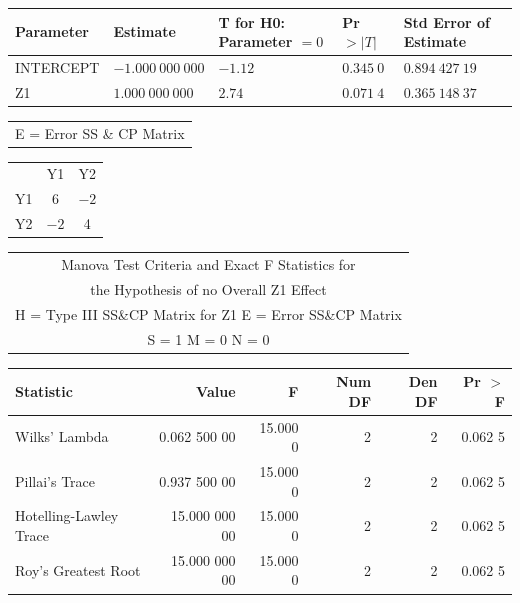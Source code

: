 
\begin{mvframe}[显示板 7.2(续)]
\begin{center}
\begin{tabular}{lllll}
\toprule
Parameter & Estimate & T for H0: Parameter $=0$ & Pr $>|T|$ & Std Error of Estimate\\
\midrule
INTERCEPT & $-1.000\ 000\ 000$ & $-1.12$ & $0.345\ 0$ & $0.894\ 427\ 19$\\
Z1 & $1.000\ 000\ 000$ & $2.74$ & $0.071\ 4$ & $0.365\ 148\ 37$\\
\bottomrule
\end{tabular}

\medskip
\begin{tabular}{c}
E = Error SS \& CP Matrix
\end{tabular}

\medskip
\begin{tabular}{ccc}
 & Y1 & Y2\\
Y1 & 6 & $-2$\\
Y2 & $-2$ & 4\\
\end{tabular}

\medskip
\begin{tabular}{c}
Manova Test Criteria and Exact F Statistics for\\
the Hypothesis of no Overall Z1 Effect\\
H = Type III SS\&CP Matrix for Z1 \quad E = Error SS\&CP Matrix\\
S = 1 \quad M = 0 \quad N = 0
\end{tabular}

\medskip
\begin{tabular}{lrrrrr}
\toprule
Statistic & Value & F & Num DF & Den DF & Pr $>$ F\\
\midrule
Wilks' Lambda & 0.062 500 00 & 15.000 0 & 2 & 2 & 0.062 5\\
Pillai's Trace & 0.937 500 00 & 15.000 0 & 2 & 2 & 0.062 5\\
Hotelling-Lawley Trace & 15.000 000 00 & 15.000 0 & 2 & 2 & 0.062 5\\
Roy's Greatest Root & 15.000 000 00 & 15.000 0 & 2 & 2 & 0.062 5\\
\bottomrule
\end{tabular}
\end{center}
\end{mvframe}

